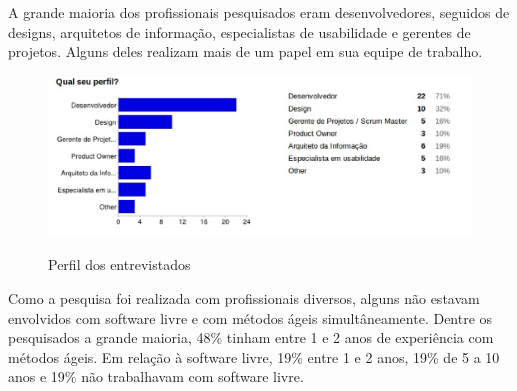	A grande maioria dos profissionais pesquisados eram desenvolvedores, seguidos de designs, arquitetos de informação, especialistas de usabilidade e gerentes de projetos. Alguns deles realizam mais de um papel em sua equipe de trabalho.
	
	\begin{figure}[!h]
    	\centering
    	\includegraphics[keepaspectratio=true,scale=0.55]
      		{figuras/perfil.eps}
    	\label{concepcao}
		\caption{Perfil dos entrevistados}
	\end{figure}
	
	Como a pesquisa foi realizada com profissionais diversos, alguns não estavam envolvidos com software livre e com métodos ágeis simultâneamente. Dentre os pesquisados a grande maioria, 48\% tinham entre 1 e 2 anos de experiência com métodos ágeis. Em relação à software livre, 19\% entre 1 e 2 anos, 19\% de 5 a 10 anos e 19\% não trabalhavam com software livre.
	
